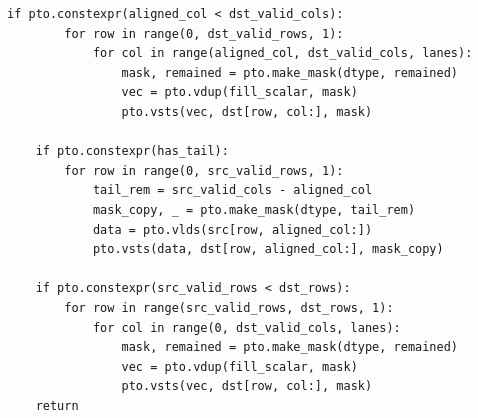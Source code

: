 \begin{lstlisting}[style=ptocode]
    if pto.constexpr(aligned_col < dst_valid_cols):
        for row in range(0, dst_valid_rows, 1):
            for col in range(aligned_col, dst_valid_cols, lanes):
                mask, remained = pto.make_mask(dtype, remained)
                vec = pto.vdup(fill_scalar, mask)
                pto.vsts(vec, dst[row, col:], mask)

    if pto.constexpr(has_tail):
        for row in range(0, src_valid_rows, 1):
            tail_rem = src_valid_cols - aligned_col
            mask_copy, _ = pto.make_mask(dtype, tail_rem)
            data = pto.vlds(src[row, aligned_col:])
            pto.vsts(data, dst[row, aligned_col:], mask_copy)

    if pto.constexpr(src_valid_rows < dst_rows):
        for row in range(src_valid_rows, dst_rows, 1):
            for col in range(0, dst_valid_cols, lanes):
                mask, remained = pto.make_mask(dtype, remained)
                vec = pto.vdup(fill_scalar, mask)
                pto.vsts(vec, dst[row, col:], mask)
    return
\end{lstlisting}
\Needspace{0.34\textheight}
